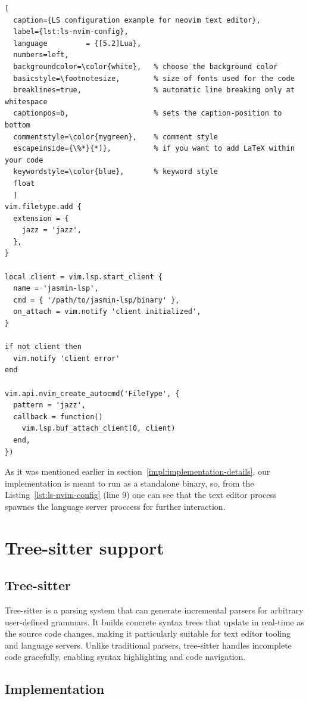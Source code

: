 \begin{lstlisting}[
  caption={LS configuration example for neovim text editor}, 
  label={lst:ls-nvim-config},
  language         = {[5.2]Lua},
  numbers=left,
  backgroundcolor=\color{white},   % choose the background color
  basicstyle=\footnotesize,        % size of fonts used for the code
  breaklines=true,                 % automatic line breaking only at whitespace
  captionpos=b,                    % sets the caption-position to bottom
  commentstyle=\color{mygreen},    % comment style
  escapeinside={\%*}{*)},          % if you want to add LaTeX within your code
  keywordstyle=\color{blue},       % keyword style
  float
  ]
vim.filetype.add {
  extension = {
    jazz = 'jazz',
  },
}

local client = vim.lsp.start_client {
  name = 'jasmin-lsp',
  cmd = { '/path/to/jasmin-lsp/binary' },
  on_attach = vim.notify 'client initialized',
}

if not client then
  vim.notify 'client error'
end

vim.api.nvim_create_autocmd('FileType', {
  pattern = 'jazz',
  callback = function()
    vim.lsp.buf_attach_client(0, client)
  end,
}) 
\end{lstlisting}

As it was mentioned earlier in section~\ref{impl:implementation-details}, our
implementation is meant to run as a standalone binary, so, from the
Listing~\ref{lst:ls-nvim-config} (line 9) one can see that the text editor process
spawnes the language server proccess for further interaction.

\section{Tree-sitter support}

\subsection{Tree-sitter}
\label{impl:tree-sitter}

Tree-sitter \cite{tree-sitter} is a parsing system that can generate incremental
parsers for arbitrary user-defined grammars. It builds concrete syntax trees
that update in real-time as the source code changes, making it particularly
suitable for text editor tooling and language servers. Unlike traditional
parsers, tree-sitter handles incomplete code gracefully, enabling syntax
highlighting and code navigation.

\subsection{Implementation}

